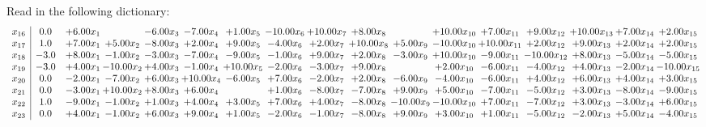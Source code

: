 \documentclass[9pt]{article}
\begin{document}
Read in the following dictionary:
\[\begin{array}{c| c c@{\hskip 2pt} c@{\hskip 2pt} c@{\hskip 2pt} c@{\hskip 2pt} c@{\hskip 2pt} c@{\hskip 2pt} c@{\hskip 2pt} c@{\hskip 2pt} c@{\hskip 2pt} c@{\hskip 2pt} c@{\hskip 2pt} c@{\hskip 2pt} c@{\hskip 2pt} c@{\hskip 2pt} c@{\hskip 2pt} }
 x_{16}   &  0.0 & +  6.00 x_{1} &   & -6.00 x_{3} & -7.00 x_{4} & +  1.00 x_{5} & -10.00 x_{6} & + 10.00 x_{7} & +  8.00 x_{8} &   & + 10.00 x_{10} & +  7.00 x_{11} & +  9.00 x_{12} & + 10.00 x_{13} & +  7.00 x_{14} & +  2.00 x_{15}\\
 x_{17}   &  1.0 & +  7.00 x_{1} & +  5.00 x_{2} & -8.00 x_{3} & +  2.00 x_{4} & +  9.00 x_{5} & -4.00 x_{6} & +  2.00 x_{7} & + 10.00 x_{8} & +  5.00 x_{9} & -10.00 x_{10} & + 10.00 x_{11} & +  2.00 x_{12} & +  9.00 x_{13} & +  2.00 x_{14} & +  2.00 x_{15}\\
 x_{18}   &  -3.0 & +  8.00 x_{1} & -1.00 x_{2} & -3.00 x_{3} & -7.00 x_{4} & -9.00 x_{5} & -1.00 x_{6} & +  9.00 x_{7} & +  2.00 x_{8} & -3.00 x_{9} & + 10.00 x_{10} & -9.00 x_{11} & -10.00 x_{12} & +  8.00 x_{13} & -5.00 x_{14} & -5.00 x_{15}\\
 x_{19}   &  -3.0 & +  4.00 x_{1} & -10.00 x_{2} & +  4.00 x_{3} & -1.00 x_{4} & + 10.00 x_{5} & -2.00 x_{6} & -3.00 x_{7} & +  9.00 x_{8} &   & +  2.00 x_{10} & -6.00 x_{11} & -4.00 x_{12} & +  4.00 x_{13} & -2.00 x_{14} & -10.00 x_{15}\\
 x_{20}   &  0.0 & -2.00 x_{1} & -7.00 x_{2} & +  6.00 x_{3} & + 10.00 x_{4} & -6.00 x_{5} & +  7.00 x_{6} & -2.00 x_{7} & +  2.00 x_{8} & -6.00 x_{9} & -4.00 x_{10} & -6.00 x_{11} & +  4.00 x_{12} & +  6.00 x_{13} & +  4.00 x_{14} & +  3.00 x_{15}\\
 x_{21}   &  0.0 & -3.00 x_{1} & + 10.00 x_{2} & +  8.00 x_{3} & +  6.00 x_{4} &   & +  1.00 x_{6} & -8.00 x_{7} & -7.00 x_{8} & +  9.00 x_{9} & +  5.00 x_{10} & -7.00 x_{11} & -5.00 x_{12} & +  3.00 x_{13} & -8.00 x_{14} & -9.00 x_{15}\\
 x_{22}   &  1.0 & -9.00 x_{1} & -1.00 x_{2} & +  1.00 x_{3} & +  4.00 x_{4} & +  3.00 x_{5} & +  7.00 x_{6} & +  4.00 x_{7} & -8.00 x_{8} & -10.00 x_{9} & -10.00 x_{10} & +  7.00 x_{11} & -7.00 x_{12} & +  3.00 x_{13} & -3.00 x_{14} & +  6.00 x_{15}\\
 x_{23}   &  0.0 & +  4.00 x_{1} & -1.00 x_{2} & +  6.00 x_{3} & +  9.00 x_{4} & +  1.00 x_{5} & -2.00 x_{6} & -1.00 x_{7} & -8.00 x_{8} & +  9.00 x_{9} & +  3.00 x_{10} & +  1.00 x_{11} & -5.00 x_{12} & -2.00 x_{13} & +  5.00 x_{14} & -4.00 x_{15}\\

\end{array}\]
\end{document}
